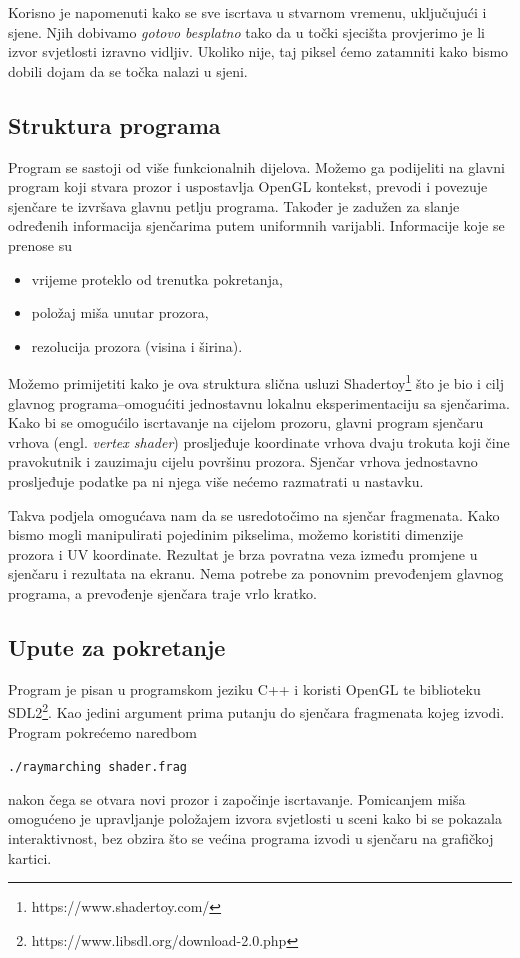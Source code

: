 \documentclass[a4paper,12pt]{article}
\newcommand{\eng}[1]{(engl. \textsl{#1}\/)}
\begin{document}
Korisno je napomenuti kako se sve iscrtava u stvarnom vremenu, uključujući i sjene. Njih dobivamo \textsl{gotovo
besplatno} tako da u točki sjecišta provjerimo je li izvor svjetlosti izravno vidljiv. Ukoliko
nije, taj piksel ćemo zatamniti kako bismo dobili dojam da se točka nalazi u sjeni.

\subsection{Struktura programa}
Program se sastoji od više funkcionalnih dijelova. Možemo ga podijeliti na glavni program koji
stvara prozor i uspostavlja OpenGL kontekst, prevodi i povezuje sjenčare te izvršava glavnu petlju
programa. Također je zadužen za slanje određenih informacija sjenčarima putem uniformnih varijabli.
Informacije koje se prenose su
\begin{itemize}
\item vrijeme proteklo od trenutka pokretanja,
\item položaj miša unutar prozora,
\item rezolucija prozora (visina i širina).
\end{itemize}

Možemo primijetiti kako je ova struktura slična usluzi Shadertoy\footnote{https://www.shadertoy.com/} što je bio i cilj glavnog programa--omogućiti jednostavnu lokalnu eksperimentaciju sa sjenčarima.
Kako bi se omogućilo iscrtavanje na cijelom prozoru, glavni program sjenčaru vrhova \eng{vertex shader} prosljeđuje
koordinate vrhova dvaju trokuta koji čine pravokutnik i zauzimaju cijelu površinu prozora.
Sjenčar vrhova jednostavno prosljeđuje podatke pa ni njega više nećemo razmatrati u nastavku.

Takva podjela omogućava nam da se usredotočimo na sjenčar fragmenata. Kako bismo mogli manipulirati pojedinim pikselima, možemo
koristiti dimenzije prozora i UV koordinate. Rezultat je brza povratna veza između promjene u
sjenčaru i rezultata na ekranu. Nema potrebe za ponovnim prevođenjem glavnog programa, a prevođenje
sjenčara traje vrlo kratko.

\subsection{Upute za pokretanje}

Program je pisan u programskom jeziku C++ i koristi OpenGL te biblioteku SDL2\footnote{https://www.libsdl.org/download-2.0.php}. Kao jedini argument prima putanju do sjenčara fragmenata kojeg izvodi.
Program pokrećemo naredbom
\begin{center}
\verb|./raymarching shader.frag|
\end{center}
nakon čega se otvara novi prozor i započinje iscrtavanje. Pomicanjem miša omogućeno je upravljanje
položajem izvora svjetlosti u sceni kako bi se pokazala interaktivnost, bez obzira što se većina
programa izvodi u sjenčaru na grafičkoj kartici.
\end{document}

